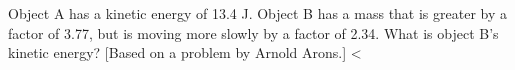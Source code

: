  Object A has a kinetic energy of 13.4 J. Object B
has a mass that is greater by a factor of 3.77, but is
moving more slowly by a factor of 2.34. What is object B's kinetic energy?
[Based on a problem by Arnold Arons.]
<%

